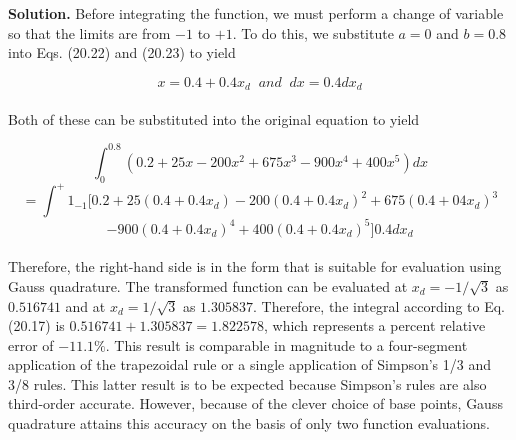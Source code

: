\textbf{Solution.} Before integrating the function, we must perform a change of variable so that
the limits are from $−1$ to $+1$. To do this, we substitute $a = 0$ and $b = 0.8$ into Eqs. (20.22)
and (20.23) to yield

	$$x=0.4+0.4x_{d}  \; \; and \; \; dx=0.4dx_{d}$$\\
Both of these can be substituted into the original equation to yield

	$$\int^{0.8}_{0} (0.2+25x - 200x^2 + 675x^3 - 900x^4 + 400x^5)dx$$ 
	$$= \int^+{1}_{-1} [0.2+25(0.4+0.4x_{d}) - 200(0.4+0.4x_{d})^{2} + 675(0.4 +04x_{d})^{3}$$ 
	$$- 900(0.4 + 0.4x_{d})^{4} + 400(0.4+0.4x_{d})^{5}]0.4dx_{d}$$\\
Therefore, the right-hand side is in the form that is suitable for evaluation using Gauss
quadrature. The transformed function can be evaluated at $x_{d} = −1/\sqrt{3}$ as $0.516741$ and at
$x_{d} = 1/\sqrt{3}$ as $1.305837$. Therefore, the integral according to Eq. (20.17) is $0.516741+
1.305837 = 1.822578$, which represents a percent relative error of $−11.1\%$. This result is
comparable in magnitude to a four-segment application of the trapezoidal rule or a single
application of Simpson’s 1/3 and 3/8 rules. This latter result is to be expected because
Simpson’s rules are also third-order accurate. However, because of the clever choice of
base points, Gauss quadrature attains this accuracy on the basis of only two function
evaluations.\\
